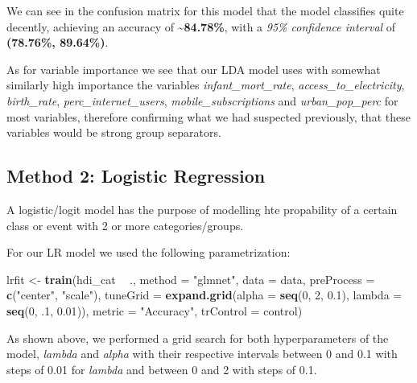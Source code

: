 \documentclass[]{article}
\newenvironment{Shaded}{\begin{snugshade}}{\end{snugshade}}
\newcommand{\DataTypeTok}[1]{\textcolor[rgb]{0.13,0.29,0.53}{#1}}
\newcommand{\DecValTok}[1]{\textcolor[rgb]{0.00,0.00,0.81}{#1}}
\newcommand{\FloatTok}[1]{\textcolor[rgb]{0.00,0.00,0.81}{#1}}
\newcommand{\KeywordTok}[1]{\textcolor[rgb]{0.13,0.29,0.53}{\textbf{#1}}}
\newcommand{\NormalTok}[1]{#1}
\newcommand{\OperatorTok}[1]{\textcolor[rgb]{0.81,0.36,0.00}{\textbf{#1}}}
\newcommand{\StringTok}[1]{\textcolor[rgb]{0.31,0.60,0.02}{#1}}
\begin{document}
\normalsize

We can see in the confusion matrix for this model that the model
classifies quite decently, achieving an accuracy of
\textbf{\textasciitilde{}84.78\%}, with a \emph{95\% confidence
interval} of \textbf{(78.76\%, 89.64\%)}.

As for variable importance we see that our LDA model uses with somewhat
similarly high importance the variables \emph{infant\_mort\_rate},
\emph{access\_to\_electricity}, \emph{birth\_rate},
\emph{perc\_internet\_users}, \emph{mobile\_subscriptions} and
\emph{urban\_pop\_perc} for most variables, therefore confirming what we
had suspected previously, that these variables would be strong group
separators.

\hypertarget{method-2-logistic-regression}{%
\subsection{Method 2: Logistic
Regression}\label{method-2-logistic-regression}}

A logistic/logit model has the purpose of modelling hte propability of a
certain class or event with 2 or more categories/groups.

For our LR model we used the following parametrization:

\footnotesize

\begin{Shaded}
\begin{Highlighting}[]
\NormalTok{lrfit <-}\StringTok{ }\KeywordTok{train}\NormalTok{(hdi_cat }\OperatorTok{~}\StringTok{ }\NormalTok{., }\DataTypeTok{method =} \StringTok{"glmnet"}\NormalTok{, }\DataTypeTok{data =}\NormalTok{ data, }\DataTypeTok{preProcess =} \KeywordTok{c}\NormalTok{(}\StringTok{"center"}\NormalTok{, }\StringTok{"scale"}\NormalTok{),}
               \DataTypeTok{tuneGrid =} \KeywordTok{expand.grid}\NormalTok{(}\DataTypeTok{alpha =} \KeywordTok{seq}\NormalTok{(}\DecValTok{0}\NormalTok{, }\DecValTok{2}\NormalTok{, }\FloatTok{0.1}\NormalTok{), }\DataTypeTok{lambda =} \KeywordTok{seq}\NormalTok{(}\DecValTok{0}\NormalTok{, }\FloatTok{.1}\NormalTok{, }\FloatTok{0.01}\NormalTok{)),}
               \DataTypeTok{metric =} \StringTok{"Accuracy"}\NormalTok{, }\DataTypeTok{trControl =}\NormalTok{ control)}
\end{Highlighting}
\end{Shaded}

\normalsize

As shown above, we performed a grid search for both hyperparameters of
the model, \emph{lambda} and \emph{alpha} with their respective
intervals between 0 and 0.1 with steps of 0.01 for \emph{lambda} and
between 0 and 2 with steps of 0.1.
\end{document}
